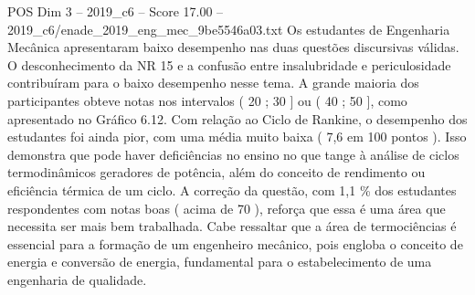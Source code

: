 \begin{textsample}{POS Dim 3 – 2019\_c6 – Score 17.00 – 2019\_c6/enade\_2019\_eng\_mec\_9be5546a03.txt}
Os estudantes de Engenharia Mecânica apresentaram baixo desempenho nas duas questões discursivas válidas.
O desconhecimento da NR 15 e a confusão entre insalubridade e periculosidade contribuíram para o baixo desempenho nesse tema.
A grande maioria dos participantes obteve notas nos intervalos ( 20 ; 30 ] ou ( 40 ; 50 ], como apresentado no Gráfico 6.12.
Com relação ao Ciclo de Rankine, o desempenho dos estudantes foi ainda pior, com uma média muito baixa ( 7,6 em 100 pontos ).
Isso demonstra que pode haver deficiências no ensino no que tange à análise de ciclos termodinâmicos geradores de potência, além do conceito de rendimento ou eficiência térmica de um ciclo.
A correção da questão, com 1,1 \% dos estudantes respondentes com notas boas ( acima de 70 ), reforça que essa é uma área que necessita ser mais bem trabalhada.
Cabe ressaltar que a área de termociências é essencial para a formação de um engenheiro mecânico, pois engloba o conceito de energia e conversão de energia, fundamental para o estabelecimento de uma engenharia de qualidade.

\end{textsample}
